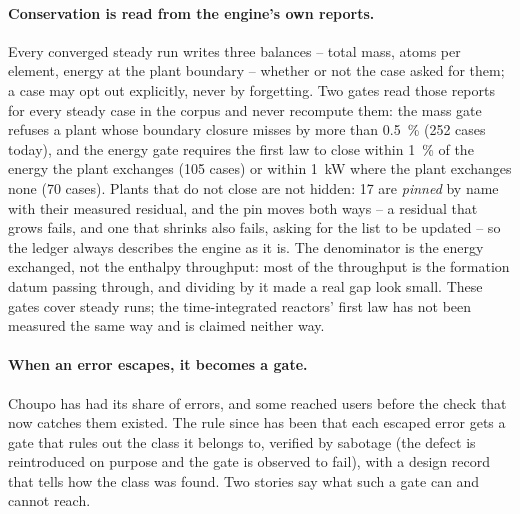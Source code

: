\documentclass[11pt,a4paper]{article}
\begin{document}
\paragraph{Conservation is read from the engine's own reports.}  Every
converged steady run writes three balances -- total mass, atoms per
element, energy at the plant boundary -- whether or not the case asked for
them; a case may opt out explicitly, never by forgetting.  Two gates read
those reports for every steady case in the corpus and never recompute them:
the mass gate refuses a plant whose boundary closure misses by more than
0.5~\% (252 cases today), and the energy gate requires the first law to
close within 1~\% of the energy the plant exchanges (105 cases) or within
1~kW where the plant exchanges none (70 cases).  Plants that do not close
are not hidden: 17 are \emph{pinned} by name with their measured residual,
and the pin moves both ways -- a residual that grows fails, and one that
shrinks also fails, asking for the list to be updated -- so the ledger
always describes the engine as it is.  The denominator is the energy
exchanged, not the enthalpy throughput: most of the throughput is the
formation datum passing through, and dividing by it made a real gap look
small.  These gates cover steady runs; the time-integrated reactors' first
law has not been measured the same way and is claimed neither way.

\paragraph{When an error escapes, it becomes a gate.}  Choupo has had its
share of errors, and some reached users before the check that now catches
them existed.  The rule since has been that each escaped error gets a gate
that rules out the class it belongs to, verified by sabotage (the defect is
reintroduced on purpose and the gate is observed to fail), with a design
record that tells how the class was found.  Two stories say what such a
gate can and cannot reach.
\end{document}
